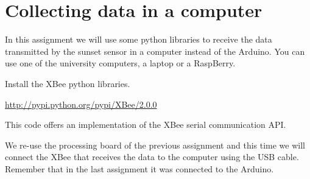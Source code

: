 \chapter{Collecting data in a computer}

In this assignment we will use some python libraries to receive the data transmitted by the sunset sensor in a computer instead of the Arduino.
You can use one of the university computers, a laptop or a RaspBerry.

Install the XBee python libraries.

\url{http://pypi.python.org/pypi/XBee/2.0.0}

This code offers an implementation of the XBee serial communication API.

We re-use the processing board of the previous assignment and this time we will connect the XBee that receives the data to the computer using the USB cable.
Remember that in the last assignment it was connected to the Arduino.


